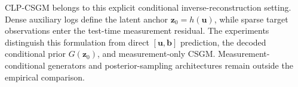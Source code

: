 CLP-CSGM belongs to this explicit conditional inverse-reconstruction setting.
Dense auxiliary logs define the latent anchor $\boldsymbol{z}_0=h(\boldsymbol{u})$,
while sparse target observations enter the test-time measurement residual. The
experiments distinguish this formulation from direct
$[\boldsymbol{u},\boldsymbol{b}]$ prediction, the decoded conditional prior
$G(\boldsymbol{z}_0)$, and measurement-only CSGM. Measurement-conditional
generators and posterior-sampling architectures remain outside the empirical
comparison.

